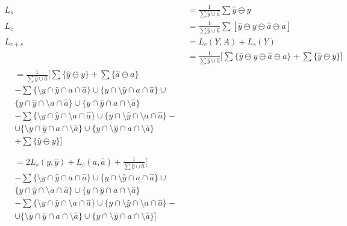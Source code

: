 \begin{align}
L_s &= \frac{1}{\sum \hat{y} \cup \hat{a}} \sum \hat{y}\ominus y \\
L_c &= \frac{1}{\sum \hat{y} \cup \hat{a}}\sum  [\hat{y}\ominus y\ominus \hat{a} \ominus a  ]\\
L_{c+s} &= L_c(Y, A) + L_s(Y)\\
&=\frac{1}{\sum \hat{y} \cup \hat{a}} \Bigg[\sum  \{\hat{y}\ominus y\ominus \hat{a} \ominus a  \} + \sum \{\hat{y}\ominus y\}  \Bigg]\\
\begin{split}
&=\frac{1}{\sum \hat{y} \cup \hat{a}} \Bigg[\sum \{\hat{y}\ominus y\} + \sum  \{\hat{a}\ominus a\}\\
&-\sum \{\setminus y\cap \hat{y} \cap a \cap \hat{a}\}\cup\{y\cap \setminus \hat{y} \cap a \cap \hat{a}\}\cup \\ 
&\{y\cap \hat{y} \cap \setminus a \cap \hat{a}\}\cup\{y\cap \hat{y} \cap a \cap \setminus \hat{a}\}\\
&-\sum\{\setminus y\cap \hat{y} \cap \setminus a \cap \hat{a}\} \cup\{y\cap \setminus \hat{y} \cap \setminus a \cap \hat{a}\} -\\
&\cup\{\setminus y\cap \hat{y} \cap a \cap \setminus\hat{a}\}\cup\{y\cap \setminus \hat{y} \cap a \cap \setminus \hat{a}\} \\ 
&+\sum \{\hat{y}\ominus y\}   \Bigg]\\
\end{split}\\
\begin{split}
&=2L_s(y, \hat{y})+L_s(a, \hat{a}) +\frac{1}{\sum \hat{y} \cup \hat{a}} \Bigg[\\
&-\sum \{\setminus y\cap \hat{y} \cap a \cap \hat{a}\}\cup\{y\cap \setminus \hat{y} \cap a \cap \hat{a}\}\cup \\ 
&\{y\cap \hat{y} \cap \setminus a \cap \hat{a}\}\cup\{y\cap \hat{y} \cap a \cap \setminus \hat{a}\}\\
&-\sum\{\setminus y\cap \hat{y} \cap \setminus a \cap \hat{a}\} \cup\{y\cap \setminus \hat{y} \cap \setminus a \cap \hat{a}\} -\\
&\cup\{\setminus y\cap \hat{y} \cap a \cap \setminus\hat{a}\}\cup\{y\cap \setminus \hat{y} \cap a \cap \setminus \hat{a}\}   \Bigg]
\end{split} \label{loss_proof}
\end{align}